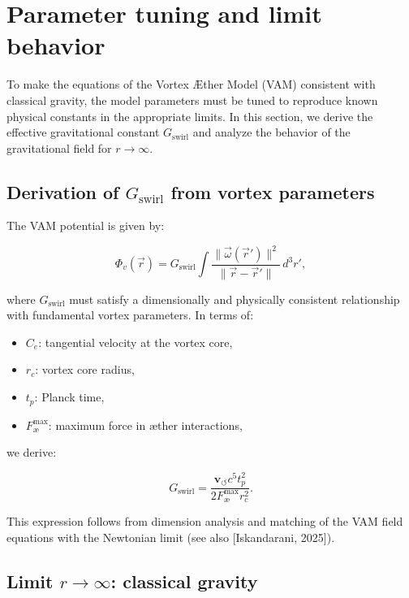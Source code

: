 \section{Parameter tuning and limit behavior}\label{sec:appendix:6}

To make the equations of the Vortex Æther Model (VAM) consistent with classical gravity, the model parameters must be tuned to reproduce known physical constants in the appropriate limits. In this section, we derive the effective gravitational constant $G_\text{swirl}$ and analyze the behavior of the gravitational field for $r \to \infty$.

\subsection{Derivation of $G_\text{swirl}$ from vortex parameters}

The VAM potential is given by:

\begin{equation}
  \Phi_v(\vec{r}) = G_\text{swirl} \int \frac{\|\vec{\omega}(\vec{r}')\|^2}{\|\vec{r} - \vec{r}'\|} \, d^3r',
\end{equation}

where $G_\text{swirl}$ must satisfy a dimensionally and physically consistent relationship with fundamental vortex parameters. In terms of:

\begin{itemize}
  \item $C_e$: tangential velocity at the vortex core,
  \item $r_c$: vortex core radius,
  \item $t_p$: Planck time,
  \item $F^{\text{max}}_{\text{\ae}}$: maximum force in æther interactions,
\end{itemize}

we derive:

\begin{equation}
  G_\text{swirl} = \frac{\mathbf{v}_{\scriptscriptstyle\boldsymbol{\circlearrowleft}} c^5 t_p^2}{2 F^{\text{max}}_{\text{\ae}} r_c^2}.
\end{equation}

This expression follows from dimension analysis and matching of the VAM field equations with the Newtonian limit (see also [Iskandarani, 2025]).

\subsection{Limit $r \to \infty$: classical gravity}

